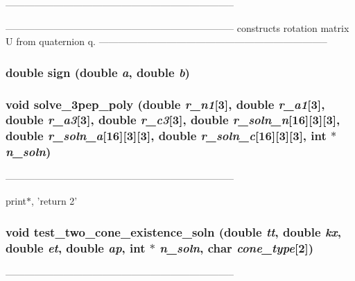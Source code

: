 ----------------------------------------------------------------------- 



----------------------------------------------------------------------- constructs rotation matrix U from quaternion q. ----------------------------------------------------------------------- 
\subsubsection{\setlength{\rightskip}{0pt plus 5cm}double sign (double {\em a}, double {\em b})}\label{PTripepClosure_8h_a5de22a245d73b37b63e87f11f67094b}


\subsubsection{\setlength{\rightskip}{0pt plus 5cm}void solve\_\-3pep\_\-poly (double {\em r\_\-n1}[3], double {\em r\_\-a1}[3], double {\em r\_\-a3}[3], double {\em r\_\-c3}[3], double {\em r\_\-soln\_\-n}[16][3][3], double {\em r\_\-soln\_\-a}[16][3][3], double {\em r\_\-soln\_\-c}[16][3][3], int $\ast$ {\em n\_\-soln})}\label{PTripepClosure_8h_0abececf5ae8dc63aa39cd3effcb9a40}


----------------------------------------------------------------------- 



print$\ast$, 'return 2' 
\subsubsection{\setlength{\rightskip}{0pt plus 5cm}void test\_\-two\_\-cone\_\-existence\_\-soln (double {\em tt}, double {\em kx}, double {\em et}, double {\em ap}, int $\ast$ {\em n\_\-soln}, char {\em cone\_\-type}[2])}\label{PTripepClosure_8h_b532d8fcac1dc01fa22c5bf6d9e136de}


----------------------------------------------------------------------- 

